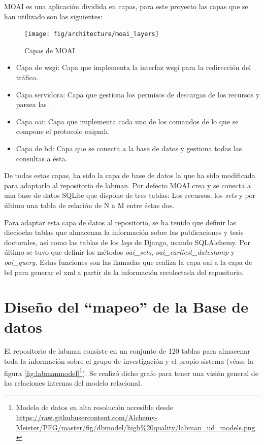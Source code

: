 MOAI es una aplicación dividida en capas, para este proyecto las capas que se han utilizado son las siguientes:

\begin{figure}[!htbp]
	\centering
	\texttt{[image: fig/architecture/moai\_layers]}
	\caption{Capas de MOAI}
	\label{fig:moai_layers}
\end{figure}

\begin{itemize}
	\item {Capa de \acrshort{wsgi}:} Capa que implementa la interfaz \acrshort{wsgi} para la redirección del tráfico.
	\item {Capa servidora:} Capa que gestiona los permisos de descargas de los recursos y parsea las .
	\item {Capa \acrshort{oai}:} Capa que implementa cada uno de los comandos de lo que se compone el protocolo \acrshort{oaipmh}.
	\item {Capa de \acrshort{bd}:} Capa que se conecta a la base de datos y gestiona todas las consultas a ésta.
\end{itemize}

De todas estas capas, ha sido la capa de base de datos la que ha sido modificada para adaptarlo al repositorio de \acrshort{labman}. Por defecto MOAI crea y se conecta a una base de datos SQLite que dispone de tres tablas: Los recursos, los \textit{sets} y por último una tabla de relación de N a M entre éstas dos.

Para adaptar esta capa de datos al repositorio, se ha tenido que definir las dieciocho tablas que almacenan la información sobre las publicaciones y tesis doctorales, así como las tablas de los \textit{logs} de Django, usando SQLAlchemy. Por último se tuvo que definir los métodos \textit{oai\_sets}, \textit{oai\_earliest\_datestamp} y \textit{oai\_query}. Estas funciones son las llamadas que realiza la capa \acrshort{oai} a la capa de \acrshort{bd} para generar el \acrshort{xml} a partir de la información recolectada del repositorio.

\section{Diseño del ``mapeo'' de la Base de datos}

El repositorio de \acrshort{labman} consiste en un conjunto de 120 tablas para almacenar toda la información sobre el grupo de investigación y el propio sistema (véase la figura \ref{fig:labmanmodel}\footnote{Modelo de datos en alta resolución accesible desde \url{https://raw.githubusercontent.com/Alchemy-Meister/PFG/master/fig/dbmodel/high\%20quality/labman\_ud\_models.png}}). Se realizó dicho grafo para tener una visión general de las relaciones internas del modelo relacional.

